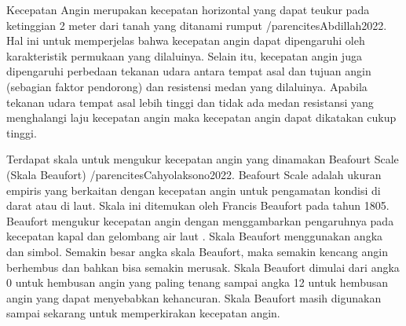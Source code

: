 Kecepatan Angin merupakan kecepatan horizontal yang dapat teukur pada ketinggian 2 meter dari tanah yang ditanami rumput /parencites{Abdillah2022}.
Hal ini untuk memperjelas bahwa kecepatan angin dapat dipengaruhi oleh karakteristik permukaan yang dilaluinya.
Selain itu, kecepatan angin juga dipengaruhi perbedaan tekanan udara antara tempat
asal dan tujuan angin (sebagian faktor pendorong) dan resistensi medan yang dilaluinya. Apabila tekanan udara tempat asal lebih tinggi dan tidak
ada medan resistansi yang menghalangi laju kecepatan angin maka kecepatan angin dapat dikatakan cukup tinggi.

Terdapat skala untuk mengukur kecepatan angin yang dinamakan Beafourt Scale (Skala Beaufort) /parencites{Cahyolaksono2022}. 
Beafourt Scale adalah ukuran empiris yang berkaitan dengan kecepatan angin untuk pengamatan kondisi di darat atau di laut. Skala ini ditemukan oleh
Francis Beaufort pada tahun 1805. Beaufort mengukur kecepatan angin dengan menggambarkan pengaruhnya pada kecepatan kapal dan gelombang air laut \parencite{book2002wind}. 
Skala
Beaufort menggunakan angka dan simbol. Semakin besar angka skala Beaufort, maka
semakin kencang angin berhembus dan bahkan bisa semakin merusak. Skala Beaufort
dimulai dari angka 0 untuk hembusan angin yang paling tenang sampai angka 12 untuk
hembusan angin yang dapat menyebabkan kehancuran. Skala Beaufort masih digunakan
sampai sekarang untuk memperkirakan kecepatan angin.

